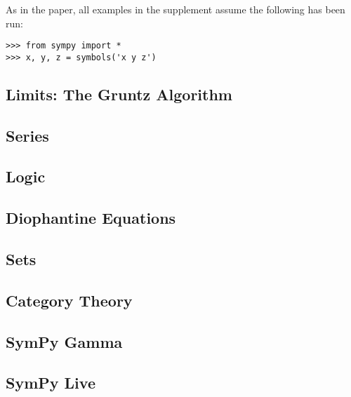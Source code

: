 As in the paper, all examples in the supplement assume the following has been
run:
\begin{verbatim}
>>> from sympy import *
>>> x, y, z = symbols('x y z')
\end{verbatim}

\subsection{Limits: The Gruntz Algorithm}



\subsection{Series}



\subsection{Logic}



\subsection{Diophantine Equations}



\subsection{Sets}


\subsection{Category Theory}


\subsection{SymPy Gamma}\label{sympy-gamma}



\subsection{SymPy Live}\label{sympy-live}



